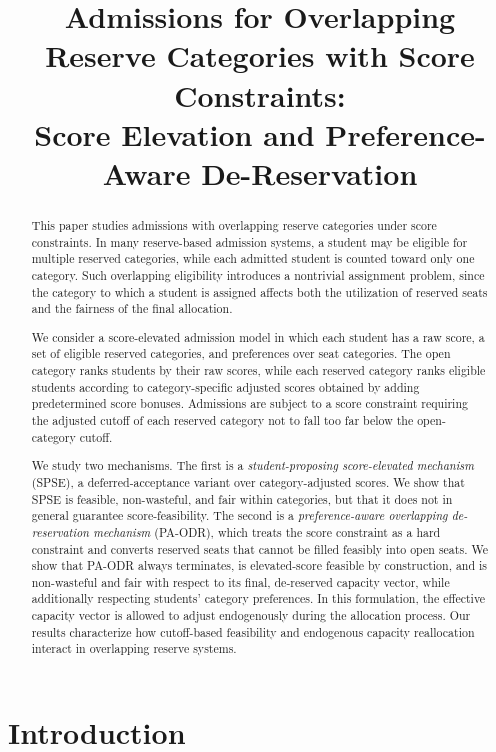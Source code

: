 \documentclass[10pt]{article}
\title{Admissions for Overlapping Reserve Categories with Score Constraints:\\
Score Elevation and Preference-Aware De-Reservation}
\author{}
\date{}
\newcommand{\1}{\mathbf{1}}
\begin{document}
\maketitle
\vspace{-2em}

\begin{abstract}
This paper studies admissions with overlapping reserve categories under score constraints. In many reserve-based admission systems, a student may be eligible for multiple reserved categories, while each admitted student is counted toward only one category. Such overlapping eligibility introduces a nontrivial assignment problem, since the category to which a student is assigned affects both the utilization of reserved seats and the fairness of the final allocation.

We consider a score-elevated admission model in which each student has a raw score, a set of eligible reserved categories, and preferences over seat categories. The open category ranks students by their raw scores, while each reserved category ranks eligible students according to category-specific adjusted scores obtained by adding predetermined score bonuses. Admissions are subject to a score constraint requiring the adjusted cutoff of each reserved category not to fall too far below the open-category cutoff.

We study two mechanisms. The first is a \emph{student-proposing score-elevated mechanism} (SPSE), a deferred-acceptance variant over category-adjusted scores. We show that SPSE is feasible, non-wasteful, and fair within categories, but that it does not in general guarantee score-feasibility. The second is a \emph{preference-aware overlapping de-reservation mechanism} (PA-ODR), which treats the score constraint as a hard constraint and converts reserved seats that cannot be filled feasibly into open seats. We show that PA-ODR always terminates, is elevated-score feasible by construction, and is non-wasteful and fair with respect to its final, de-reserved capacity vector, while additionally respecting students' category preferences. In this formulation, the effective capacity vector is allowed to adjust endogenously during the allocation process. Our results characterize how cutoff-based feasibility and endogenous capacity reallocation interact in overlapping reserve systems.
\end{abstract}

\section{Introduction}
\end{document}
